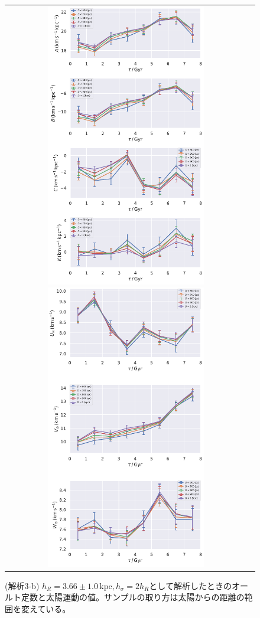 \begin{figure}[htbp]
   \centering
\begin{tabular}{cc}
\includegraphics[width=7cm]{fig/ABCK_3b.pdf}
\includegraphics[width=7cm]{fig/UVW_3b.pdf}
\end{tabular}
    \caption{(解析3-b) $h_R=3.66\pm 1.0\,\mathrm{kpc},h_{\sigma}=2h_R$として解析したときのオールト定数と太陽運動の値。サンプルの取り方は太陽からの距離の範囲を変えている。}
    \label{figObs3b}
\end{figure}

